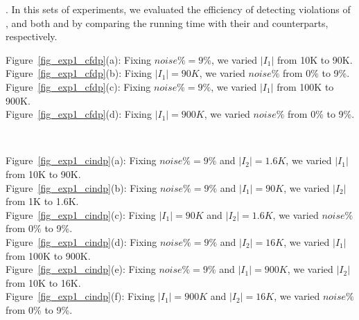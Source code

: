 . In this sets of experiments, we evaluated the efficiency of detecting violations of \pCFDs, \pCINDs and both \pCFDs and \pCINDs by comparing the running time with their \CFDs and \CINDs counterparts, respectively.

\begin{figure*}
  \centering
  \quad
  \quad
  \quad
  \caption{Efficiency of detecting \pCFD violations}\label{fig_exp1_cfdp}
\end{figure*}

\noindent Figure~\ref{fig_exp1_cfdp}(a): Fixing $noise\% = 9\%$, we varied $|I_1|$ from 10K to 90K.    \\
Figure~\ref{fig_exp1_cfdp}(b): Fixing $|I_1|=90K$, we varied $noise\%$ from 0\% to 9\%.\\
Figure~\ref{fig_exp1_cfdp}(c): Fixing $noise\% = 9\%$, we varied $|I_1|$ from 100K to 900K.  \\
Figure~\ref{fig_exp1_cfdp}(d): Fixing $|I_1|=900K$, we varied $noise\%$ from 0\% to 9\%.  \\


\begin{figure*}
  \centering
  \quad
  \quad
  \quad \\
  \quad
  \quad
  \caption{Efficiency of detecting \pCIND violations}\label{fig_exp1_cindp}
\end{figure*}

\noindent Figure~\ref{fig_exp1_cindp}(a): Fixing $noise\% = 9\%$ and $|I_2| = 1.6K$, we varied $|I_1|$ from 10K to 90K. \\
Figure~\ref{fig_exp1_cindp}(b): Fixing $noise\% = 9\%$ and $|I_1| = 90K$, we varied $|I_2|$ from 1K to 1.6K.\\
Figure~\ref{fig_exp1_cindp}(c): Fixing $|I_1| = 90K$ and $|I_2| = 1.6K$, we varied $noise\%$ from 0\% to 9\%.\\
Figure~\ref{fig_exp1_cindp}(d): Fixing $noise\% = 9\%$ and $|I_2| = 16K$, we varied $|I_1|$ from 100K to 900K.\\
Figure~\ref{fig_exp1_cindp}(e): Fixing $noise\% = 9\%$ and $|I_1| = 900K$, we varied $|I_2|$ from 10K to 16K.\\
Figure~\ref{fig_exp1_cindp}(f): Fixing $|I_1| = 900K$ and $|I_2| = 16K$, we varied $noise\%$ from 0\% to 9\%.\\



